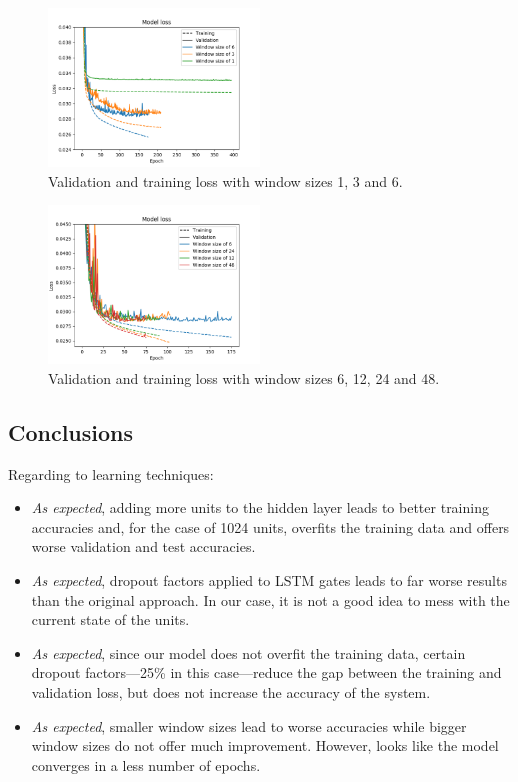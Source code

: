 \documentclass[]{article}
\begin{document}
	\begin{figure}[H]
		\centering
		\includegraphics[width=0.5\textwidth]{variables_4_1}
		\caption{Validation and training loss with window sizes 1, 3 and 6.}
		\label{f:variables_4_1}
	\end{figure}
	
	\begin{figure}[H]
		\centering
		\includegraphics[width=0.5\textwidth]{variables_4_2}
		\caption{Validation and training loss with window sizes 6, 12, 24 and 48.}
		\label{f:variables_4_2}
	\end{figure}
	
	\subsection{Conclusions}
	
	Regarding to learning techniques:
	
	\begin{itemize}
		\item \emph{As expected}, adding more units to the hidden layer leads to better training accuracies and, for the case of 1024 units, overfits the training data and offers worse validation and test accuracies.
		
		\item \emph{As expected}, dropout factors applied to LSTM gates leads to far worse results than the original approach. In our case, it is not a good idea to mess with the current state of the units.
		
		\item \emph{As expected}, since our model does not overfit the training data, certain dropout factors---25\% in this case---reduce the gap between the training and validation loss, but does not increase the accuracy of the system.
		
		\item \emph{As expected}, smaller window sizes lead to worse accuracies while bigger window sizes do not offer much improvement. However, looks like the model converges in a less number of epochs.
	\end{itemize}
	
\end{document}
